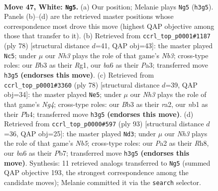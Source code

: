 \documentclass[11pt]{article}
\begin{document}
\clearpage

\begin{figure}[p]\centering
\begin{subfigure}{0.46\textwidth}\centering
\resizebox{\linewidth}{!}{%
\newchessgame
\chessboard[
  setfen={6k1/5p1p/b5p1/4Pp2/5P2/1B5N/P4KPP/1nr5 w - - 2 47},
  showmover=false,
  pgfstyle=straightmove, color=movearrow, markmove={h3-g5}
]}
\caption{}
\end{subfigure}\hfill
\begin{subfigure}{0.46\textwidth}\centering
\resizebox{\linewidth}{!}{%
\newchessgame
\chessboard[
  setfen={6r1/p7/2pk4/3p1bp1/1P5p/PNP2P2/3K3P/6R1 w - - 0 40},
  showmover=false,
  pgfstyle=straightmove, color=movearrow, markmove={b3-c5}
]}
\caption{}
\end{subfigure}
\\[4pt]
\begin{subfigure}{0.46\textwidth}\centering
\resizebox{\linewidth}{!}{%
\newchessgame
\chessboard[
  setfen={6k1/5pp1/3Bp1p1/3p4/3P2NP/6P1/r4PK1/8 w - - 0 40},
  showmover=false,
  pgfstyle=straightmove, color=movearrow, markmove={g4-e5}
]}
\caption{}
\end{subfigure}\hfill
\begin{subfigure}{0.46\textwidth}\centering
\resizebox{\linewidth}{!}{%
\newchessgame
\chessboard[
  setfen={7r/1p3p2/2kppb2/8/1n1P1PK1/2N1P1B1/1P6/2R5 b - - 11 47},
  showmover=false,
  pgfstyle=straightmove, color=movearrow, markmove={b4-d3}
]}
\caption{}
\end{subfigure}
\caption{\textbf{Move 47, White: \texttt{Ng5}.} (a) Our position; Melanie plays \texttt{Ng5} (\texttt{h3g5}). Panels (b)--(d) are the retrieved master positions whose correspondence most drove this move (highest QAP objective among those that transfer to it). (b) Retrieved from \texttt{ccrl\_top\_p0001\#1187} (ply 78) [structural distance $d$=41, QAP obj=43]: the master played \texttt{Nc5}; under $\mu$ our \emph{Nh3} plays the role of that game's \emph{Nb3}; cross-type roles: our \emph{B}b3 as their \emph{R}g1, our \emph{b}a6 as their \emph{P}a3; transferred move \texttt{h3g5} \textbf{(endorses this move)}. (c) Retrieved from \texttt{ccrl\_top\_p0001\#3360} (ply 78) [structural distance $d$=39, QAP obj=34]: the master played \texttt{Ne5}; under $\mu$ our \emph{Nh3} plays the role of that game's \emph{Ng4}; cross-type roles: our \emph{B}b3 as their \emph{r}a2, our \emph{n}b1 as their \emph{P}h4; transferred move \texttt{h3g5} \textbf{(endorses this move)}. (d) Retrieved from \texttt{ccrl\_top\_p0000\#597} (ply 93) [structural distance $d$=36, QAP obj=25]: the master played \texttt{Nd3}; under $\mu$ our \emph{Nh3} plays the role of that game's \emph{Nb5}; cross-type roles: our \emph{P}a2 as their \emph{R}h8, our \emph{b}a6 as their \emph{P}b7; transferred move \texttt{h3g5} \textbf{(endorses this move)}. Synthesis: 11 retrieved analogs transferred to \texttt{Ng5} (summed QAP objective 193, the strongest correspondence among the candidate moves); Melanie committed it via the \texttt{search} selector.}
\label{fig:thought-m92}
\end{figure}
\end{document}
